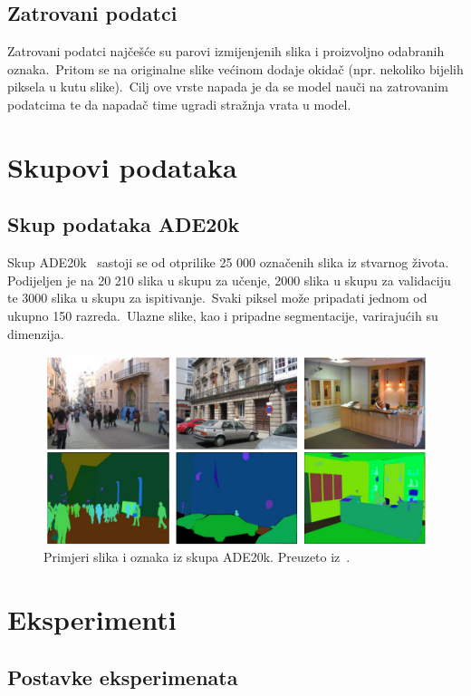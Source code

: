 \documentclass[times, utf8, seminar, numeric]{fer}
\begin{document}
\section{Zatrovani podatci}

Zatrovani podatci najčešće su parovi izmijenjenih slika i proizvoljno odabranih oznaka.\ Pritom se na originalne slike većinom dodaje okidač (npr. nekoliko bijelih piksela u kutu slike).\ Cilj ove vrste napada je da se model nauči na zatrovanim podatcima te da napadač time ugradi stražnja vrata u model.

\chapter{Skupovi podataka}

\section{Skup podataka ADE20k}

Skup ADE20k~\cite{zhou2019semantic} sastoji se od otprilike 25 000 označenih slika iz stvarnog života. Podijeljen je na 20 210 slika u skupu za učenje, 2000 slika u skupu za validaciju te 3000 slika u skupu za ispitivanje.\ 
Svaki piksel može pripadati jednom od ukupno 150 razreda.\ Ulazne slike, kao i pripadne segmentacije, varirajućih su dimenzija.
  
\begin{figure}[htb]
    \centering
    \includegraphics[scale=1]{./Slike/ade20k.png}
    \caption{Primjeri slika i oznaka iz skupa ADE20k. Preuzeto iz~\cite{zhou2019semantic}.}
    \label{fig:ade20k}
\end{figure}
\chapter{Eksperimenti}

\section{Postavke eksperimenata}
\end{document}
